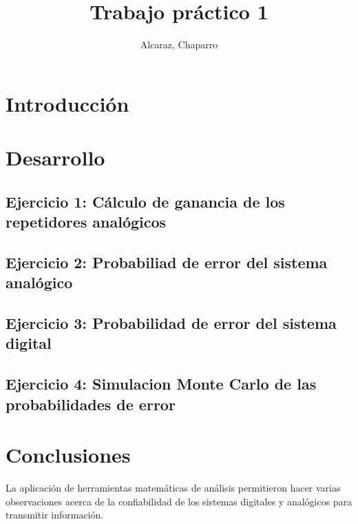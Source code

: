 \documentclass[12pt]{article}
\title{Trabajo práctico 1}
\author{Alcaraz, Chaparro}
\begin{document}
	
	
	\pagestyle{fancy}
	
	\setcounter{page}{1}
	
	
	\newpage
	
	\tableofcontents
	
	\newpage
	\section{Introducción}
		
		
	
	\section{Desarrollo}	
		\subsection{Ejercicio 1: Cálculo de ganancia de los repetidores analógicos}
	
			
		
		\subsection{Ejercicio 2: Probabiliad de error del sistema analógico}
		
			
		
		\subsection{Ejercicio 3: Probabilidad de error del sistema digital}
		
			
		
		\subsection{Ejercicio 4: Simulacion Monte Carlo de las probabilidades de error}
			
			
			
		\section{Conclusiones}			
La aplicación de herramientas matemáticas de análisis permitieron hacer varias observaciones acerca de la confiabilidad de los sistemas digitales y analógicos para transmitir información. 
\end{document}
